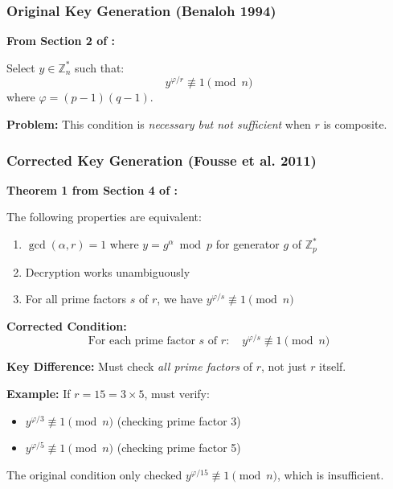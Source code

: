 \documentclass[11pt]{article}
\theoremstyle{definition}
\begin{document}
\subsubsection{Original Key Generation (Benaloh 1994)}

\textbf{From Section 2 of \cite{fousse2011benaloh}:}

Select $y \in \mathbb{Z}_n^*$ such that:
\begin{equation}
y^{\varphi/r} \not\equiv 1 \pmod{n}
\tag{Original Condition}
\end{equation}
where $\varphi = (p-1)(q-1)$.

\textbf{Problem:} This condition is \emph{necessary but not sufficient} when $r$ is composite.

\subsubsection{Corrected Key Generation (Fousse et al. 2011)}

\textbf{Theorem 1 from Section 4 of \cite{fousse2011benaloh}:}

The following properties are equivalent:
\begin{enumerate}
\item[(a)] $\gcd(\alpha, r) = 1$ where $y = g^\alpha \bmod p$ for generator $g$ of $\mathbb{Z}_p^*$
\item[(b)] Decryption works unambiguously
\item[(c)] For all prime factors $s$ of $r$, we have $y^{\varphi/s} \not\equiv 1 \pmod{n}$
\end{enumerate}

\textbf{Corrected Condition:}
\begin{equation}
\boxed{\text{For each prime factor } s \text{ of } r: \quad y^{\varphi/s} \not\equiv 1 \pmod{n}}
\tag{Corrected Condition}
\end{equation}

\textbf{Key Difference:} Must check \emph{all prime factors} of $r$, not just $r$ itself.

\textbf{Example:} If $r = 15 = 3 \times 5$, must verify:
\begin{itemize}
\item $y^{\varphi/3} \not\equiv 1 \pmod{n}$ (checking prime factor 3)
\item $y^{\varphi/5} \not\equiv 1 \pmod{n}$ (checking prime factor 5)
\end{itemize}

The original condition only checked $y^{\varphi/15} \not\equiv 1 \pmod{n}$, which is insufficient.
\end{document}
